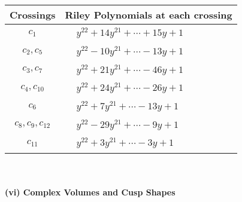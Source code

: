 \documentclass[1p]{elsarticle_modified}
\theoremstyle{definition}
\begin{document}
\begin{tabular}{m{50pt}|m{274pt}}
Crossings & \hspace{64pt}Riley Polynomials at each crossing \\
\hline $$\begin{aligned}c_{1}\end{aligned}$$&$\begin{aligned}
&y^{22}+14 y^{21}+\cdots+15 y+1
\end{aligned}$\\
\hline $$\begin{aligned}c_{2},c_{5}\end{aligned}$$&$\begin{aligned}
&y^{22}-10 y^{21}+\cdots-13 y+1
\end{aligned}$\\
\hline $$\begin{aligned}c_{3},c_{7}\end{aligned}$$&$\begin{aligned}
&y^{22}+21 y^{21}+\cdots-46 y+1
\end{aligned}$\\
\hline $$\begin{aligned}c_{4},c_{10}\end{aligned}$$&$\begin{aligned}
&y^{22}+24 y^{21}+\cdots-26 y+1
\end{aligned}$\\
\hline $$\begin{aligned}c_{6}\end{aligned}$$&$\begin{aligned}
&y^{22}+7 y^{21}+\cdots-13 y+1
\end{aligned}$\\
\hline $$\begin{aligned}c_{8},c_{9},c_{12}\end{aligned}$$&$\begin{aligned}
&y^{22}-29 y^{21}+\cdots-9 y+1
\end{aligned}$\\
\hline $$\begin{aligned}c_{11}\end{aligned}$$&$\begin{aligned}
&y^{22}+3 y^{21}+\cdots-3 y+1
\end{aligned}$\\
\hline
\end{tabular}\\~\\
\newpage\flushleft \textbf{(vi) Complex Volumes and Cusp Shapes}
\end{document}
